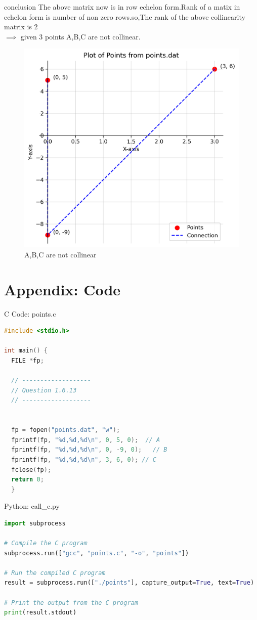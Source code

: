\documentclass{beamer}
\numberwithin{equation}{section}
\theoremstyle{remark}
\begin{document}
\begin{frame}{conclusion}
 The above matrix now is in row echelon form.Rank of a matix in echelon form is number of non zero rows.so,The rank of the above collinearity matrix is 2\\
 $\implies$ given 3 points A,B,C are not collinear.
 \begin{figure}[h!]
   \centering
   \includegraphics[width=0.5\linewidth]{figs/01.png}
   \caption{A,B,C are not collinear}
   \label{}
\end{figure}
\end{frame}
\section*{Appendix: Code}

\begin{frame}[fragile]{C Code: points.c}
\begin{lstlisting}[language=C]
#include <stdio.h>

int main() {
  FILE *fp;

  // -------------------
  // Question 1.6.13
  // -------------------


  fp = fopen("points.dat", "w");
  fprintf(fp, "%d,%d,%d\n", 0, 5, 0);  // A
  fprintf(fp, "%d,%d,%d\n", 0, -9, 0);   // B
  fprintf(fp, "%d,%d,%d\n", 3, 6, 0); // C
  fclose(fp);
  return 0;
  }
\end{lstlisting}
\end{frame}

\begin{frame}[fragile]{Python: call\_c.py}
\begin{lstlisting}[language=Python]
import subprocess

# Compile the C program
subprocess.run(["gcc", "points.c", "-o", "points"])

# Run the compiled C program
result = subprocess.run(["./points"], capture_output=True, text=True)

# Print the output from the C program
print(result.stdout)
\end{lstlisting}
\end{frame}
\end{document}
